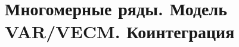 \documentclass[12pt]{article}
\theoremstyle{remark}
\newtheorem{exercise}{}[subsection]
\begin{document}








\section{Многомерные ряды. Модель VAR/VECM. Коинтеграция}
\end{document}
